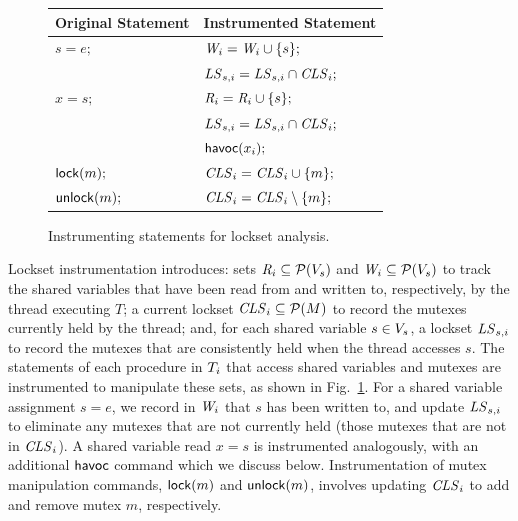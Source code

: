 \begin{figure}
\footnotesize
\center
\begin{tabular}{ll}
\textbf{Original Statement} & \textbf{Instrumented Statement} \\
\toprule

$s = e;$ & $\mathit{W}_{i} = \mathit{W}_{i} \cup \{ s \};$ \\
         & $\mathit{LS}_{s,i} = \mathit{LS}_{s,i} \cap \mathit{CLS}_{i};$ \\
\midrule
         
$x = s;$ & $\mathit{R}_{i} = \mathit{R}_{i} \cup \{ s \};$ \\
         & $\mathit{LS}_{s,i} = \mathit{LS}_{s,i} \cap \mathit{CLS}_{i};$ \\
         & $\mathsf{havoc}({x_{i}});$ \\
\midrule
         
$\mathsf{lock}(m);$   & $\mathit{CLS}_{i} = \mathit{CLS}_{i} \cup \{ m \};$ \\
\midrule

$\mathsf{unlock}(m);$ & $\mathit{CLS}_{i} = \mathit{CLS}_{i} \setminus \{ m \};$ \\
\bottomrule
\end{tabular}
\caption{Instrumenting statements for lockset analysis.}
\label{fig:instrumentation}
\end{figure}

Lockset instrumentation introduces: sets $\mathit{R}_{i} \subseteq \mathcal{P}(V_s)$ and $\mathit{W}_{i} \subseteq \mathcal{P}(V_s)$ to track the shared variables that have been read from and written to, respectively, by the thread executing $T$; a current lockset $\mathit{CLS}_{i} \subseteq \mathcal{P}(M)$ to record the mutexes currently held by the thread; and, for each shared variable $s \in V_s$, a lockset $\mathit{LS}_{s,i}$ to record the mutexes that are consistently held when the thread accesses $s$.
%
The statements of each procedure in $T_{i}$ that access shared variables and mutexes are instrumented to manipulate these sets, as shown in Fig.~\ref{fig:instrumentation}.  For a shared variable assignment $s = e$, we record in $\mathit{W}_{i}$ that $s$ has been written to, and update $\mathit{LS}_{s,i}$ to eliminate any mutexes that are not currently held (those mutexes that are not in $\mathit{CLS}_{i}$).  A shared variable read $x = s$ is instrumented analogously, with an additional $\mathsf{havoc}$ command which we discuss below.  Instrumentation of mutex manipulation commands, $\mathsf{lock}(m)$ and $\mathsf{unlock}(m)$, involves updating $\mathit{CLS}_{i}$ to add and remove mutex $m$, respectively.

